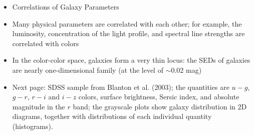 \documentclass[letterpaper,landscape]{slides}
\begin{document}
\begin{slide}
{\begin{minipage}[t]{14cm}
\vskip -1in
\begin{itemize}
\item
{\large \color{red} Correlations of Galaxy Parameters}
\item
{\color{blue} Many physical parameters are correlated with each other}; for example,
the luminosity, concentration of the light profile, and spectral line 
strengths are correlated with colors
\item
In the color-color space, galaxies form a very thin locus: {\color{blue} the SEDs of
galaxies are nearly one-dimensional family} (at the level of $\sim$0.02 mag)
\item Next page: SDSS sample from Blanton et al. (2003); the quantities
are $u-g$, $g-r$, $r-i$ and $i-z$ colors, surface brightness, Sersic index,
and absolute magnitude in the $r$ band; the grayscale plots show galaxy 
distribution in 2D diagrams, together with distributions of each individual 
quantity (histograms).
\end{itemize}  

\end{minipage}}
\vfill 
\end{slide}



\begin{slide}
\begin{center}
\end{center}
\vfill
\end{slide}
\end{document}
